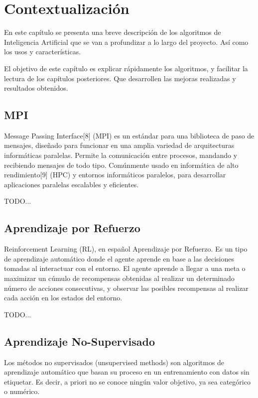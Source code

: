 \chapter{Contextualización}
	En este capítulo se presenta una breve descripción de los algoritmos de Inteligencia Artificial que se van a profundizar a lo largo del proyecto. Así como los usos y características. 
	
	El objetivo de este capítulo es explicar rápidamente los algoritmos, y facilitar la lectura de los capítulos posteriores. Que desarrollen las mejoras realizadas y resultados obtenidos.
	
	
	\newpage %
	\section{MPI}
		Message Passing Interface[8]  (MPI)  es un estándar para una biblioteca de paso de mensajes, diseñado para funcionar en una amplia variedad de arquitecturas informáticas paralelas. Permite la comunicación entre procesos, mandando y recibiendo mensajes de todo tipo. Comúnmente usado en informática de alto rendimiento[9] (HPC) y entornos informáticos paralelos, para desarrollar aplicaciones paralelas escalables y eficientes.
		
		TODO...
	
	\newpage	
	\section{Aprendizaje por Refuerzo}
		Reinforcement Learning (RL), en español Aprendizaje por Refuerzo. Es un tipo de aprendizaje automático donde el agente aprende en base a las decisiones tomadas al interactuar con el entorno. El agente aprende a llegar a una meta o maximizar un cúmulo de recompensas obtenidas al realizar un determinado número de acciones consecutivas, y observar las posibles recompensas al realizar cada acción en los estados del entorno.
		
		TODO...
		
	\newpage %
	\section{Aprendizaje No-Supervisado}
		Los métodos no supervisados (unsupervised methods) son algoritmos de aprendizaje automático que basan su proceso en un entrenamiento con datos sin etiquetar. Es decir, a priori no se conoce ningún valor objetivo, ya sea categórico o numérico. 
		
